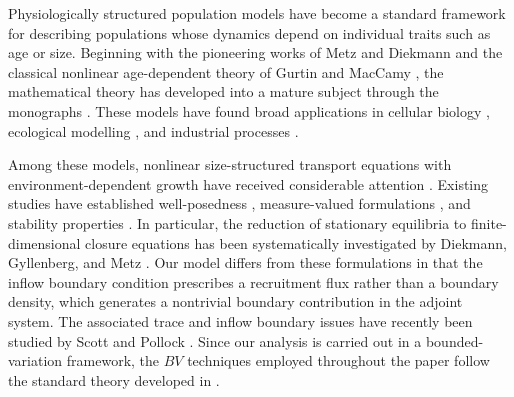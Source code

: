 \documentclass[a4paper,fleqn,longmktitle]{cas-sc}
\theoremstyle{plain}
\theoremstyle{definition}
\theoremstyle{remark}
\numberwithin{equation}{section}
\begin{document}
Physiologically structured population models have become a standard framework
for describing populations whose dynamics depend on individual traits such as
age or size. Beginning with the pioneering works of Metz and Diekmann
\cite{metz2014dynamics} and the classical nonlinear age-dependent theory of
Gurtin and MacCamy \cite{gurtin1974non}, the mathematical theory has developed
into a mature subject through the monographs
\cite{webb1985theory,iannelli1995mathematical,wang2025analysis,perthame2007transport,magal2018theory,cushing1998introduction}.
These models have found broad applications in cellular biology
\cite{bonnet2020multiscale,yu2026microscopic,doumic2011structured,liang2025global,grabosch2020production,wang2026damage,wang2025analysis1},
ecological modelling \cite{thieme1988well,tian2018global,liu2025bidirectional},
and industrial processes
\cite{coron2012controllability,li2022controllability,shang2011analysis,wang2026algebraic}.

Among these models, nonlinear size-structured transport equations with
environment-dependent growth have received considerable attention
\cite{calsina1995model,kato2004general,yu2026rigorous,jie2026optimal,fotso2023optimal}.
Existing studies have established well-posedness
\cite{kato2004general,ackleh2016general,ainseba2022population,yu2026pattern,ainseba2020adaptative,clement2024well},
measure-valued formulations
\cite{ackleh2005measure,franco2022integral,franco2023modelling,wang2026breakdown},
and stability properties
\cite{farkas2007stability}.
In particular, the reduction of stationary equilibria to finite-dimensional
closure equations has been systematically investigated by
Diekmann, Gyllenberg, and Metz \cite{diekmann2003steady}.
Our model differs from these formulations in that the inflow boundary condition
prescribes a recruitment flux rather than a boundary density, which generates a
nontrivial boundary contribution in the adjoint system.
The associated trace and inflow boundary issues have recently been studied by
Scott and Pollock \cite{scott2022transport,yu2026beyond}.
Since our analysis is carried out in a bounded-variation framework,
the \(BV\) techniques employed throughout the paper follow the standard theory
developed in
\cite{ambrosio2000functions}.
\end{document}
